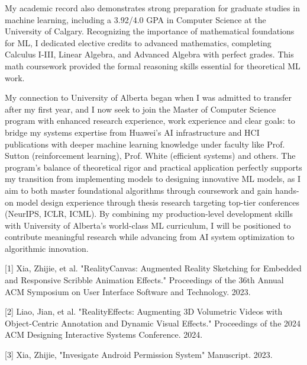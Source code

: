 \documentclass{article}
\begin{document}
My academic record also demonstrates strong preparation for graduate studies in machine learning, including a 3.92/4.0 GPA in Computer Science at the University of Calgary. Recognizing the importance of mathematical foundations for ML, I dedicated elective credits to advanced mathematics, completing Calculus I-III, Linear Algebra, and Advanced Algebra with perfect grades. This math coursework provided the formal reasoning skills essential for theoretical ML work.

My connection to University of Alberta began when I was admitted to transfer after my first year, and I now seek to join the Master of Computer Science program with enhanced research experience, work experience and clear goals: to bridge my systems expertise from Huawei's AI infrastructure and HCI publications with deeper machine learning knowledge under faculty like Prof. Sutton (reinforcement learning), Prof. White (efficient systems) and others. The program's balance of theoretical rigor and practical application perfectly supports my transition from implementing models to designing innovative ML models, as I aim to both master foundational algorithms through coursework and gain hands-on model design experience through thesis research targeting top-tier conferences (NeurIPS, ICLR, ICML). By combining my production-level development skills with University of Alberta's world-class ML curriculum, I will be positioned to contribute meaningful research while advancing from AI system optimization to algorithmic innovation.






\vspace{0.125in}



[1] Xia, Zhijie, et al. "RealityCanvas: Augmented Reality Sketching for Embedded and Responsive Scribble Animation Effects." Proceedings of the 36th Annual ACM Symposium on User Interface Software and Technology. 2023.

[2] Liao, Jian, et al. "RealityEffects: Augmenting 3D Volumetric Videos with Object-Centric Annotation and Dynamic Visual Effects." Proceedings of the 2024 ACM Designing Interactive Systems Conference. 2024.

[3] Xia, Zhijie, "Invesigate Android Permission System" Manuscript. 2023.
\end{document}
